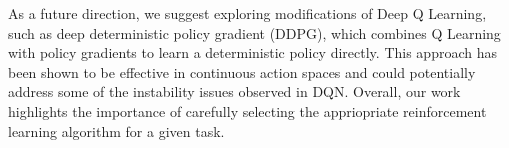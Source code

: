 \documentclass{article}
\begin{document}
As a future direction, we suggest exploring modifications of Deep Q Learning,
such as deep deterministic policy gradient (DDPG), which combines Q Learning
with policy gradients to learn a deterministic policy directly. This approach
has been shown to be effective in continuous action spaces and could
potentially address some of the instability issues observed in DQN. Overall,
our work highlights the importance of carefully selecting the appriopriate
reinforcement learning algorithm for a given task.

\newpage
\nocite{*}


\end{document}
